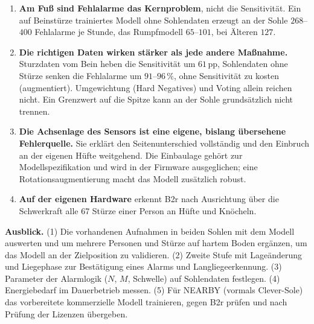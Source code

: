 \documentclass[11pt,a4paper,oneside,parskip=half,open=any,
               numbers=noenddot,listof=totoc,bibliography=totoc]{scrreprt}
\begin{document}
\begin{enumerate}\setlength\itemsep{1pt}
\item \textbf{Am Fuß sind Fehlalarme das Kernproblem}, nicht die
      Sensitivität. Ein auf Beinstürze trainiertes Modell ohne
      Sohlendaten erzeugt an der Sohle $268$--$400$ Fehlalarme je
      Stunde, das Rumpfmodell $65$--$101$, bei Älteren $127$.
\item \textbf{Die richtigen Daten wirken stärker als jede andere
      Maßnahme.} Sturzdaten vom Bein heben die Sensitivität um $61$\,pp,
      Sohlendaten ohne Stürze senken die Fehlalarme um $91$--$96\,\%$,
      ohne Sensitivität zu kosten (augmentiert). Umgewichtung (Hard
      Negatives) und Voting allein reichen nicht. Ein Grenzwert auf die
      Spitze kann an der Sohle grundsätzlich nicht trennen.
\item \textbf{Die Achsenlage des Sensors ist eine eigene, bislang
      übersehene Fehlerquelle.} Sie erklärt den Seitenunterschied
      vollständig und den Einbruch an der eigenen Hüfte weitgehend.
      Die Einbaulage gehört zur Modellspezifikation und wird in der
      Firmware ausgeglichen; eine Rotationsaugmentierung macht das
      Modell zusätzlich robust.
\item \textbf{Auf der eigenen Hardware} erkennt B2r nach Ausrichtung über
      die Schwerkraft alle 67 Stürze einer Person an Hüfte und Knöcheln.
\end{enumerate}

\textbf{Ausblick.} (1) Die vorhandenen Aufnahmen in beiden Sohlen mit
dem Modell auswerten und um mehrere Personen und Stürze auf hartem Boden
ergänzen, um das Modell an der Zielposition zu validieren. (2) Zweite Stufe mit
Lageänderung und Liegephase zur Bestätigung eines Alarms und
Langliegeerkennung. (3) Parameter der Alarmlogik ($N$, $M$, Schwelle)
auf Sohlendaten festlegen. (4) Energiebedarf im Dauerbetrieb messen.
(5) Für NEARBY (vormals Clever-Sole) das vorbereitete kommerzielle
Modell trainieren, gegen B2r prüfen und nach Prüfung der Lizenzen
übergeben.


\end{document}
